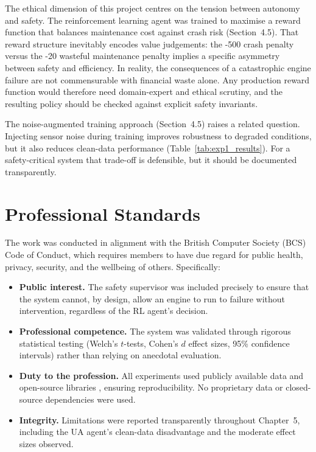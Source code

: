\documentclass[12pt,a4paper]{report}
\begin{document}
The ethical dimension of this project centres on the tension between autonomy and safety. The reinforcement learning agent was trained to maximise a reward function that balances maintenance cost against crash risk (Section~4.5). That reward structure inevitably encodes value judgements: the -500 crash penalty versus the -20 wasteful maintenance penalty implies a specific asymmetry between safety and efficiency. In reality, the consequences of a catastrophic engine failure are not commensurable with financial waste alone. Any production reward function would therefore need domain-expert and ethical scrutiny, and the resulting policy should be checked against explicit safety invariants.

The noise-augmented training approach (Section~4.5) raises a related question. Injecting sensor noise during training improves robustness to degraded conditions, but it also reduces clean-data performance (Table~\ref{tab:exp1_results}). For a safety-critical system that trade-off is defensible, but it should be documented transparently.

\section{Professional Standards}

The work was conducted in alignment with the British Computer Society (BCS) Code of Conduct, which requires members to have due regard for public health, privacy, security, and the wellbeing of others. Specifically:

\begin{itemize}
    \item \textbf{Public interest.} The safety supervisor was included precisely to ensure that the system cannot, by design, allow an engine to run to failure without intervention, regardless of the RL agent's decision.
    \item \textbf{Professional competence.} The system was validated through rigorous statistical testing (Welch's $t$-tests, Cohen's $d$ effect sizes, 95\% confidence intervals) rather than relying on anecdotal evaluation.
    \item \textbf{Duty to the profession.} All experiments used publicly available data and open-source libraries \citep{paszke2019pytorch, raffin2021stable}, ensuring reproducibility. No proprietary data or closed-source dependencies were used.
    \item \textbf{Integrity.} Limitations were reported transparently throughout Chapter~5, including the UA agent's clean-data disadvantage and the moderate effect sizes observed.
\end{itemize}
\end{document}
